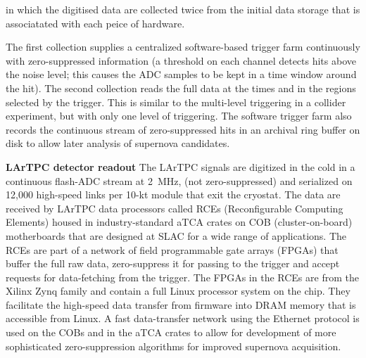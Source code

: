 in which the digitised data are collected twice from the initial data
storage that is associatated with each peice of hardware. 

The first collection
supplies a centralized software-based trigger farm continuously with
zero-suppressed information (a threshold on each channel detects hits
above the noise level; this causes the ADC samples to be kept in a
time window around the hit).  
The second collection reads the full data at the times and
in the regions %
selected by the
trigger. This is similar to the multi-level triggering in a collider experiment,
but with only one level of triggering.
The software trigger farm also
records the continuous stream of zero-suppressed hits in an archival
ring buffer on disk to allow later analysis of supernova candidates.

{\bf LArTPC detector readout} The LArTPC signals are digitized in the
cold in a
continuous flash-ADC stream at 2~MHz, (not zero-suppressed) and
serialized on 12,000 high-speed links per 10-kt module that exit the
cryostat.
The data
are received by LArTPC data processors called RCEs (Reconfigurable
Computing Elements) %
housed in
industry-standard aTCA crates on COB (cluster-on-board) motherboards that are designed at SLAC
for a wide range of applications.  The RCEs are part of a network of
field programmable gate arrays (FPGAs) that buffer the full raw data,
zero-suppress it for passing to the trigger and accept requests for
data-fetching from the trigger.  The FPGAs in the RCEs are from the
Xilinx Zynq family and contain a full Linux processor system on the
chip.  They facilitate the high-speed data transfer from firmware into
DRAM memory that is accessible from Linux.  A fast data-transfer
network using the Ethernet protocol is used on the COBs and in the
aTCA crates to allow for development of more sophisticated zero-suppression algorithms
for improved supernova acquisition.

